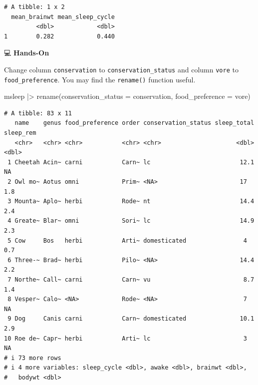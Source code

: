 \documentclass[
  letterpaper,
  DIV=11,
  numbers=noendperiod]{scrreprt}
\newenvironment{Shaded}{\begin{snugshade}}{\end{snugshade}}
\newcommand{\AttributeTok}[1]{\textcolor[rgb]{0.40,0.45,0.13}{#1}}
\newcommand{\FunctionTok}[1]{\textcolor[rgb]{0.28,0.35,0.67}{#1}}
\newcommand{\NormalTok}[1]{\textcolor[rgb]{0.00,0.23,0.31}{#1}}
\newcommand{\SpecialCharTok}[1]{\textcolor[rgb]{0.37,0.37,0.37}{#1}}
\begin{document}
\begin{verbatim}
# A tibble: 1 x 2
  mean_brainwt mean_sleep_cycle
         <dbl>            <dbl>
1        0.282            0.440
\end{verbatim}

💻 \textbf{Hands-On}

Change column \texttt{conservation} to \texttt{conservation\_status} and
column \texttt{vore} to \texttt{food\_preference}. You may find the
\texttt{rename()} function useful.

\begin{tcolorbox}[enhanced jigsaw, colbacktitle=quarto-callout-tip-color!10!white, opacitybacktitle=0.6, breakable, left=2mm, leftrule=.75mm, toprule=.15mm, toptitle=1mm, bottomtitle=1mm, colframe=quarto-callout-tip-color-frame, opacityback=0, coltitle=black, arc=.35mm, titlerule=0mm, colback=white, bottomrule=.15mm, title=\textcolor{quarto-callout-tip-color}{\faLightbulb}\hspace{0.5em}{Answer}, rightrule=.15mm]

\begin{Shaded}
\begin{Highlighting}[]
\NormalTok{msleep }\SpecialCharTok{|\textgreater{}}
  \FunctionTok{rename}\NormalTok{(}\AttributeTok{conservation\_status =}\NormalTok{ conservation,}
         \AttributeTok{food\_preference =}\NormalTok{ vore)}
\end{Highlighting}
\end{Shaded}

\begin{verbatim}
# A tibble: 83 x 11
   name    genus food_preference order conservation_status sleep_total sleep_rem
   <chr>   <chr> <chr>           <chr> <chr>                     <dbl>     <dbl>
 1 Cheetah Acin~ carni           Carn~ lc                         12.1      NA  
 2 Owl mo~ Aotus omni            Prim~ <NA>                       17         1.8
 3 Mounta~ Aplo~ herbi           Rode~ nt                         14.4       2.4
 4 Greate~ Blar~ omni            Sori~ lc                         14.9       2.3
 5 Cow     Bos   herbi           Arti~ domesticated                4         0.7
 6 Three-~ Brad~ herbi           Pilo~ <NA>                       14.4       2.2
 7 Northe~ Call~ carni           Carn~ vu                          8.7       1.4
 8 Vesper~ Calo~ <NA>            Rode~ <NA>                        7        NA  
 9 Dog     Canis carni           Carn~ domesticated               10.1       2.9
10 Roe de~ Capr~ herbi           Arti~ lc                          3        NA  
# i 73 more rows
# i 4 more variables: sleep_cycle <dbl>, awake <dbl>, brainwt <dbl>,
#   bodywt <dbl>
\end{verbatim}

\end{tcolorbox}
\end{document}
